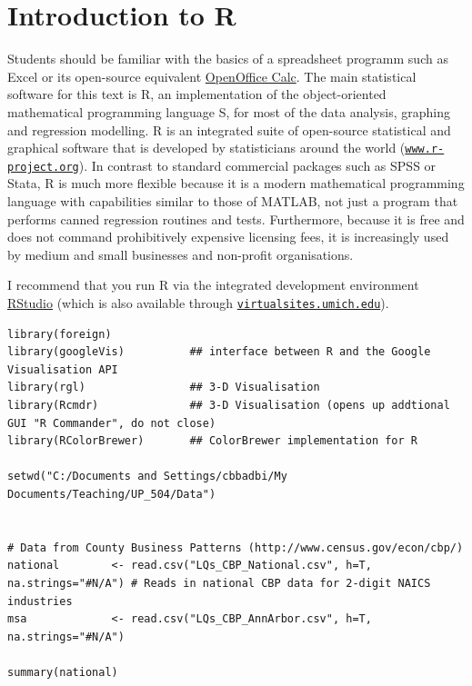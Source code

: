 \chapter{Introduction to \textsf{R}}\label{app_IntroR}

Students should be familiar with the basics of a spreadsheet programm such as Excel or its open-source equivalent \href{http://www.openoffice.org/product/calc.html}{OpenOffice Calc}. The main statistical software for this text is \textsf{R}, an implementation of the object-oriented mathematical programming language \textsf{S},  for most of the data analysis, graphing and regression modelling. \textsf{R} is an integrated suite of open-source statistical and graphical software that is developed by statisticians around the world (\href{http://www.r-project.org}{\texttt{www.r-project.org}}). In contrast to standard commercial packages such as \textsf{SPSS} or \textsf{Stata}, \textsf{R} is much more flexible because it is a modern mathematical programming language with capabilities similar to those of \textsf{MATLAB}, not just a program that performs canned regression routines and tests. Furthermore, because it is free and does not command prohibitively expensive licensing fees, it is increasingly used by medium and small businesses and non-profit organisations.

I recommend that you run \textsf{R} via the integrated development environment \href{http://rstudio.org/}{RStudio} (which is also available through \href{http://virtualsites.umich.edu}{\texttt{virtualsites.umich.edu}}).


\begin{lstlisting}
library(foreign)
library(googleVis)          ## interface between R and the Google Visualisation API
library(rgl)                ## 3-D Visualisation
library(Rcmdr)              ## 3-D Visualisation (opens up addtional GUI "R Commander", do not close)
library(RColorBrewer)       ## ColorBrewer implementation for R

setwd("C:/Documents and Settings/cbbadbi/My Documents/Teaching/UP_504/Data")


# Data from County Business Patterns (http://www.census.gov/econ/cbp/)
national        <- read.csv("LQs_CBP_National.csv", h=T, na.strings="#N/A") # Reads in national CBP data for 2-digit NAICS industries
msa             <- read.csv("LQs_CBP_AnnArbor.csv", h=T, na.strings="#N/A")

summary(national)
\end{lstlisting}



